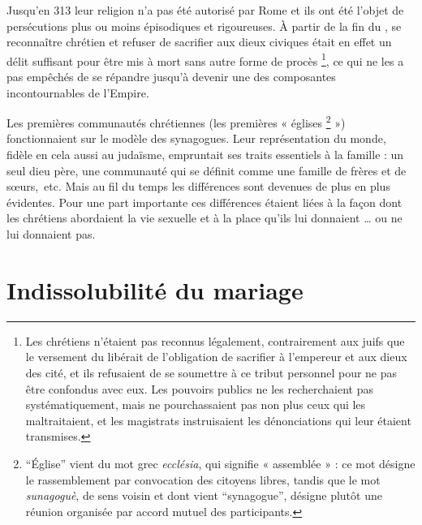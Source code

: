 Jusqu'en 313 leur religion n'a pas été autorisé par Rome et ils ont été l'objet de persécutions plus ou moins épisodiques et rigoureuses. À partir de la fin du , se reconnaître chrétien et refuser de sacrifier aux dieux civiques était en effet un délit suffisant pour être mis à mort sans autre forme de procès
\footnote{Les chrétiens n'étaient pas reconnus légalement, contrairement aux juifs que le versement du  libérait de l'obligation de sacrifier à l'empereur et aux dieux des cité, et ils refusaient de se soumettre à ce tribut personnel pour ne pas être confondus avec eux. Les pouvoirs publics ne les recherchaient pas systématiquement, mais ne pourchassaient pas non plus ceux qui les maltraitaient, et les magistrats instruisaient les dénonciations qui leur étaient transmises.},  
ce qui ne les a pas empêchés de se répandre jusqu'à devenir une des composantes incontournables de l'Empire. 

 Les premières communautés chrétiennes (les premières « églises%
\footnote{\enquote{Église} vient du mot grec \emph{ecclésia}, qui signifie « assemblée » : ce mot désigne le rassemblement par convocation des citoyens libres, tandis que le mot \emph{sunagoguè}, de sens voisin et dont vient \enquote{synagogue}, désigne plutôt une réunion organisée par accord mutuel des participants.}
») fonctionnaient sur le modèle des synagogues. Leur représentation du monde, fidèle en cela aussi au judaïsme, empruntait ses traits essentiels à la famille : un seul dieu père, une communauté qui se définit comme une famille de frères et de sœurs,~etc. Mais au fil du temps les différences sont devenues de plus en plus évidentes. Pour une part importante ces différences étaient liées à la façon dont les chrétiens abordaient la vie sexuelle et à la place qu'ils lui donnaient … ou ne lui donnaient pas. 


\section{Indissolubilité du mariage}

